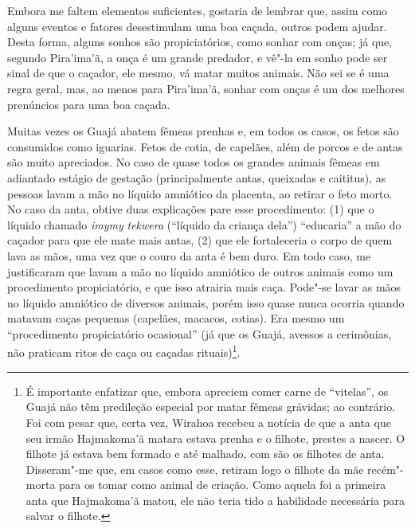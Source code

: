 Embora me faltem elementos suficientes, gostaria de lembrar que, assim
como alguns eventos e fatores desestimulam uma boa caçada, outros podem
ajudar. Desta forma, alguns sonhos são propiciatórios, como sonhar com
onças; já que, segundo Pira'ima'ã, a onça é um grande predador, e vê"-la
em sonho pode ser sinal de que o caçador, ele mesmo, vá matar muitos
animais. Não sei se é uma regra geral, mas, ao menos para Pira'ima'ã,
sonhar com onças é um dos melhores prenúncios para uma boa caçada.

Muitas vezes os Guajá abatem fêmeas prenhas e, em todos os casos, os
fetos são consumidos como iguarias. Fetos de cotia, de capelães, além de
porcos e de antas são muito apreciados. No caso de quase todos os
grandes animais fêmeas em adiantado estágio de gestação (principalmente
antas, queixadas e caititus), as pessoas lavam a mão no líquido
amniótico da placenta, ao retirar o feto morto. No caso da anta, obtive
duas explicações pare esse procedimento: (1) que o líquido chamado
\emph{imymy} \emph{tekwera} (``líquido da criança dela'') ``educaria'' a mão
do caçador para que ele mate mais antas, (2) que ele fortaleceria o
corpo de quem lava as mãos, uma vez que o couro da anta é bem duro. Em
todo caso, me justificaram que lavam a mão no líquido amniótico de
outros animais como um procedimento propiciatório, e que isso atrairia
mais caça. Pode"-se lavar as mãos no líquido amniótico de diversos
animais, porém isso quase nunca ocorria quando matavam caças pequenas
(capelães, macacos, cotias). Era mesmo um ``procedimento propiciatório
ocasional'' (já que os Guajá, avessos a cerimônias, não praticam ritos de
caça ou caçadas rituais)\footnote{É importante enfatizar que, embora
  apreciem comer carne de ``vitelas'', os Guajá não têm predileção
  especial por matar fêmeas grávidas; ao contrário. Foi com pesar que,
  certa vez, Wirahoa recebeu a notícia de que a anta que seu irmão
  Hajmakoma'ã matara estava prenha e o filhote, prestes a nascer. O
  filhote já estava bem formado e até malhado, com são os filhotes de
  anta. Disseram"-me que, em casos como esse, retiram logo o filhote da
  mãe recém"-morta para os tomar como animal de criação. Como aquela foi
  a primeira anta que Hajmakoma'ã matou, ele não teria tido a habilidade
  necessária para salvar o filhote.}.

